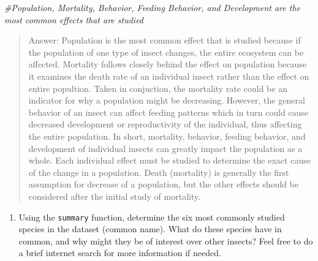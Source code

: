 \documentclass[]{article}
\newenvironment{Shaded}{\begin{snugshade}}{\end{snugshade}}
\newcommand{\CommentTok}[1]{\textcolor[rgb]{0.56,0.35,0.01}{\textit{#1}}}
\newcommand{\KeywordTok}[1]{\textcolor[rgb]{0.13,0.29,0.53}{\textbf{#1}}}
\newcommand{\NormalTok}[1]{#1}
\newcommand{\OperatorTok}[1]{\textcolor[rgb]{0.81,0.36,0.00}{\textbf{#1}}}
\providecommand{\tightlist}{%
  \setlength{\itemsep}{0pt}\setlength{\parskip}{0pt}}
\begin{document}
\begin{Shaded}
\begin{Highlighting}[]
\CommentTok{#Population, Mortality, Behavior, Feeding Behavior, and Development are the most common effects that are studied}
\end{Highlighting}
\end{Shaded}

\begin{quote}
Answer: Population is the most common effect that is studied because if
the population of one type of insect changes, the entire ecosystem can
be affected. Mortality follows closely behind the effect on population
because it examines the death rate of an individual insect rather than
the effect on entire popultion. Taken in conjuction, the mortality rate
could be an indicator for why a population might be decreasing. However,
the general behavior of an insect can affect feeding patterns which in
turn could cause decreased development or reproductivity of the
individual, thus affecting the entire population. In short, mortality,
behavior, feeding behavior, and development of individual insects can
greatly impact the population as a whole. Each individual effect must be
studied to determine the exact cause of the change in a population.
Death (mortality) is generally the first assumption for decrease of a
population, but the other effects should be considered after the initial
study of mortality.
\end{quote}

\begin{enumerate}
\def\labelenumi{\arabic{enumi}.}
\setcounter{enumi}{6}
\tightlist
\item
  Using the \texttt{summary} function, determine the six most commonly
  studied species in the dataset (common name). What do these species
  have in common, and why might they be of interest over other insects?
  Feel free to do a brief internet search for more information if
  needed.
\end{enumerate}

\begin{Shaded}
\end{Shaded}
\end{document}
